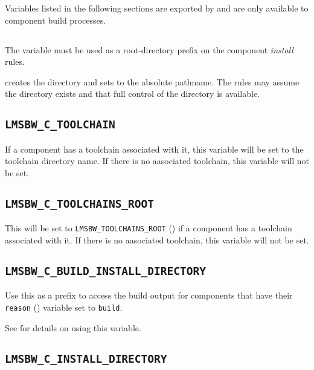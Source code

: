 Variables listed in the following sections are exported by \lmsbw and
are only available to component build processes.

\subsection{\destdir}

The \destdir variable must be used as a root-directory prefix on the
component \emph{install} rules.

\lmsbw creates the directory and sets \destdir to the absolute
pathname.  The rules may assume the directory exists and that full
control of the directory is available.


\subsection{\texttt{LMSBW\_C\_TOOLCHAIN}}\label{wrap:lmsbw-c-toolchain}

If a component has a toolchain associated with it, this variable will
be set to the toolchain directory name.  If there is no aasociated
toolchain, this variable will not be set.

\subsection{\texttt{LMSBW\_C\_TOOLCHAINS\_ROOT}}\label{wrap:lmsbw-c-toolchains-root}

This will be set to \texttt{LMSBW\_TOOLCHAINS\_ROOT}
() if a component has a toolchain
associated with it.  If there is no aasociated toolchain, this
variable will not be set.

\subsection{\texttt{LMSBW\_C\_BUILD\_INSTALL\_DIRECTORY}}\label{wrap:build-install-directory}

Use this as a prefix to access the build output for components that
have their \texttt{reason} () variable set to
\texttt{build}.

See  for details on using this variable.

\subsection{\texttt{LMSBW\_C\_INSTALL\_DIRECTORY}}

